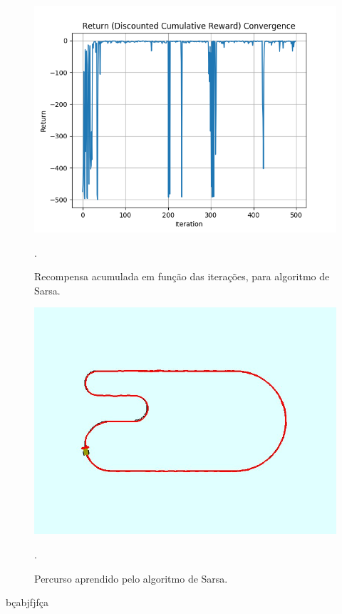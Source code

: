 \documentclass[conference]{IEEEtran}
\begin{document}
\begin{figure}[htbp]
\centering
\centerline{\includegraphics[scale=0.5]{imagens/sarsa/return_convergence.png}}
\caption{Recompensa acumulada em função das iterações, para algoritmo de Sarsa.}.
\label{sarsa/return_convergence}
\end{figure}

\begin{figure}[htbp]
\centering
\centerline{\includegraphics[scale=0.25]{imagens/sarsa/line_follower_solution.jpeg}}
\caption{Percurso aprendido pelo algoritmo de Sarsa.}.
\label{sarsa/line_follower_solution}
\end{figure}

bçabjfjfça
\end{document}
